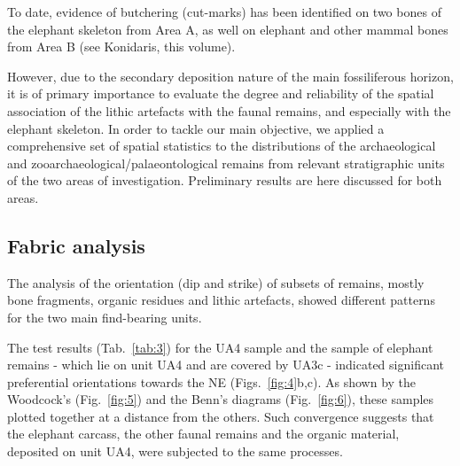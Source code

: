 \documentclass[review,authoryear,times]{elsarticle} %
\begin{document}
To date, evidence of butchering (cut-marks) has been identified on two bones of the elephant skeleton from Area A, as well on elephant and other mammal bones from Area B (see Konidaris, this volume).

However, due to the secondary deposition nature of the main fossiliferous horizon, it is of primary importance to evaluate the degree and reliability of the spatial association of the lithic artefacts with the faunal remains, and especially with the elephant skeleton. In order to tackle our main objective, we applied a comprehensive set of spatial statistics to the distributions of the archaeological and zooarchaeological/palaeontological remains from relevant stratigraphic units of the two areas of investigation. Preliminary results are here discussed for both areas.

\subsection{Fabric analysis}



The analysis of the orientation (dip and strike) of subsets of remains, mostly bone fragments, organic residues and lithic artefacts, showed different patterns for the two main find-bearing units.


The test results (Tab.~\ref{tab:3}) for the UA4 sample and the sample of elephant remains - which lie on unit UA4 and are covered by UA3c - indicated significant preferential orientations towards the NE (Figs.~\ref{fig:4}b,c). As shown by the Woodcock's (Fig.~\ref{fig:5}) and the Benn's diagrams (Fig.~\ref{fig:6}), these samples plotted together at a distance from the others. Such convergence suggests that the elephant carcass, the other faunal remains and the organic material, deposited on unit UA4, were subjected to the same processes.
\end{document}
